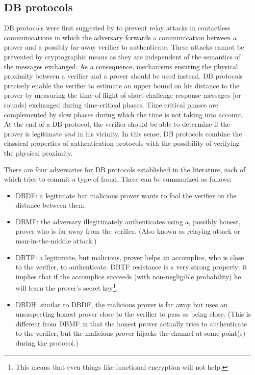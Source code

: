 \subsection{\Acl*{DB} protocols}%
\label{distance-bounding}

\Ac{DB} protocols were first suggested by \citet{DistanceBounding} to prevent relay attacks in contactless communications in which the adversary forwards a communication between a prover and a possibly far-away verifier to authenticate. 
These attacks cannot be prevented by cryptographic means as they are independent of the semantics of the messages exchanged.
As a consequence, mechanisms ensuring the physical proximity between a verifier and a prover should be used instead.
\Ac{DB} protocols precisely enable the verifier to estimate an upper bound on his distance to the prover by measuring the time-of-flight of short challenge-response messages (or rounds) exchanged during time-critical phases. 
Time critical phases are complemented by slow phases during which the time is not taking into account. 
At the end of a \Ac{DB} protocol, the verifier should be able to determine if the prover is legitimate \emph{and} in his vicinity.
In this sense, \Ac{DB} protocols combine the classical properties of authentication protocols with the possibility of verifying the physical proximity.

There are four adversaries for \ac{DB} protocols established in the literature, 
each of which tries to commit a type of fraud.
These can be summarized as follows:
\begin{itemize}
  \item \Acf{DBDF}: a legitimate but malicious prover wants to fool the verifier on the distance between them.
  \item \Acf{DBMF}: the adversary illegitimately authenticates using a, 
    possibly honest, prover who is far away from the verifier.
    (Also known as relaying attack or man-in-the-middle attack.)
  \item \Acf{DBTF}: a legitimate, but malicious, prover helps an accomplice, 
    who is close to the verifier, to authenticate.
    \Ac{DBTF} resistance is a very strong property; it implies that if the 
    accomplice succeeds (with non-negligible probability) he will learn the 
    prover's secret key\footnote{%
      This means that even things like functional encryption will not help.
    }.
  \item \Acf{DBDH}: similar to \ac{DBDF}, the malicious prover is far away but 
    uses an unsuspecting honest prover close to the verifier to pass as being 
    close.
    (This is different from \ac{DBMF} in that the honest prover actually tries 
    to authenticate to the verifier, but the malicious prover hijacks the 
    channel at some point(s) during the protocol.)
\end{itemize}

